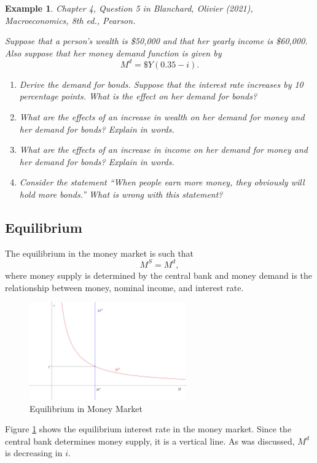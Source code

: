 \documentclass[12pt]{article}
\newtheorem{example}{Example}
\begin{document}
\begin{example}
	Chapter 4, Question 5 in Blanchard, Olivier (2021), \textit{Macroeconomics}, 8th ed., Pearson.

	Suppose that a person's wealth is \$50,000 and that her yearly income is \$60,000. Also suppose that her money demand function is given by
	\[M^d = \$ Y (0.35 - i).\]

	\begin{enumerate}[label=(\alph*)]
		\item Derive the demand for bonds. Suppose that the interest rate increases by 10 percentage points. What is the effect on her demand for bonds?
		\vspace{36pt}
		\item What are the effects of an increase in wealth on her demand for money and her demand for bonds? Explain in words.
		\vspace{36pt}
		\item What are the effects of an increase in income on her demand for money and her demand for bonds? Explain in words.
		\vspace{36pt}
		\item Consider the statement ``When people earn more money, they obviously will hold more bonds.'' What is wrong with this statement?
		\vspace{36pt}
	\end{enumerate}
\end{example}

\subsection*{Equilibrium}
The equilibrium in the money market is such that 
\[M^S = M^d,\]
where money supply is determined by the central bank and money demand is the relationship between money, nominal income, and interest rate. 

\begin{figure}[htp]
    \centering
    \includegraphics[width=0.6\textwidth]{money_eqm_01.png}
    \caption{Equilibrium in Money Market}
    \label{fig:money_eqm_01}
\end{figure}
Figure \ref{fig:money_eqm_01} shows the equilibrium interest rate in the money market. Since the central bank determines money supply, it is a vertical line. As was discussed, $M^d$ is decreasing in $i$.
\end{document}
